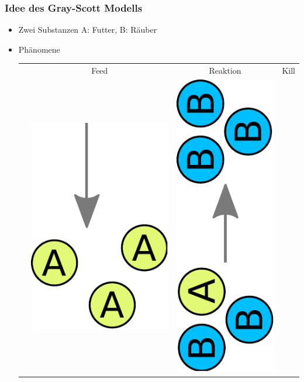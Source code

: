 \documentclass[aspectratio=32]{beamer}
\newcommand{\blob}{\rule[2.2pt]{3pt}{3pt}}
\newcommand{\reditem}{\item[\textcolor{simtechred}{$\blob$}]}
\begin{document}
\begin{frame}
\frametitle{Idee des Gray-Scott Modells}
\begin{itemize}
  \reditem Zwei Substanzen A: Futter, B: Räuber
  \reditem Phänomene
\begin{tabular}{ r c c c }
	& Feed & Reaktion & Kill \\
	&
  \includegraphics[height=\textwidth/6,keepaspectratio]{Bilder/gs_feed.pdf}
	&
  \includegraphics[height=\textwidth/6,keepaspectratio,angle=-90,origin=c]{Bilder/gs_reaction.pdf}

\end{tabular}
\end{itemize}
\end{frame}
\end{document}
